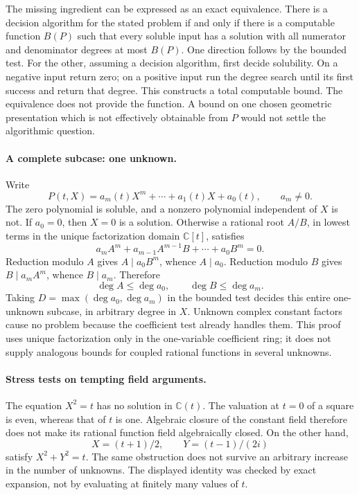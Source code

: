 \documentclass[11pt]{article}
\begin{document}
The missing ingredient can be expressed as an exact equivalence.
There is a decision algorithm for the stated problem if and only if
there is a computable function $B(P)$ such that every soluble input has
a solution with all numerator and denominator degrees at most $B(P)$.
One direction follows by the bounded test. For the other, assuming a
decision algorithm, first decide solubility. On a negative input return
zero; on a positive input run the degree search until its first success
and return that degree. This constructs a total computable bound.
The equivalence does not provide the function. A bound on one chosen
geometric presentation which is not effectively obtainable from $P$
would not settle the algorithmic question.

\paragraph{A complete subcase: one unknown.}
Write
\[
 P(t,X)=a_m(t)X^m+\cdots+a_1(t)X+a_0(t),
 \qquad a_m\ne0.
\]
The zero polynomial is soluble, and a nonzero polynomial independent of
$X$ is not. If $a_0=0$, then $X=0$ is a solution. Otherwise a rational
root $A/B$, in lowest terms in the unique factorization domain
$\mathbb C[t]$, satisfies
\[
 a_m A^m+a_{m-1}A^{m-1}B+\cdots+a_0B^m=0.
\]
Reduction modulo $A$ gives $A\mid a_0B^m$, whence $A\mid a_0$.
Reduction modulo $B$ gives $B\mid a_m A^m$, whence $B\mid a_m$.
Therefore
\[
 \deg A\le\deg a_0,\qquad \deg B\le\deg a_m.       \tag{2}
\]
Taking $D=\max(\deg a_0,\deg a_m)$ in the bounded test decides this
entire one-unknown subcase, in arbitrary degree in $X$. Unknown complex
constant factors cause no problem because the coefficient test already
handles them. This proof uses unique factorization only in the
one-variable coefficient ring; it does not supply analogous bounds for
coupled rational functions in several unknowns.

\paragraph{Stress tests on tempting field arguments.}
The equation $X^2=t$ has no solution in $\mathbb C(t)$. The valuation
at $t=0$ of a square is even, whereas that of $t$ is one. Algebraic
closure of the constant field therefore does not make its rational
function field algebraically closed. On the other hand,
\[
 X=(t+1)/2,\qquad Y=(t-1)/(2i)
\]
satisfy $X^2+Y^2=t$. The same obstruction does not survive an arbitrary
increase in the number of unknowns. The displayed identity was checked
by exact expansion, not by evaluating at finitely many values of $t$.
\end{document}
